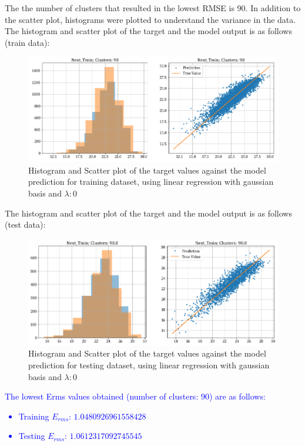 \documentclass[12pt,a4paper]{article}
\newcommand{\noi}{\noindent}
\begin{document}
\noi
The the number of clusters that resulted in the lowest RMSE is 90. In addition to the scatter plot, histograms were plotted to understand the variance in the data.\\

\noi
The histogram and scatter plot of the target and the model output is as follows (train data):
\begin{figure}[H]
     \centering
     \includegraphics[scale=0.49]{images/t3_d3/no_reg/T_min_nclu_90.png}
     \caption{Histogram and Scatter plot of the target values against the model prediction for training dataset, using linear regression with gaussian basis and $\lambda: 0$}
\end{figure}

\noi
The histogram and scatter plot of the target and the model output is as follows (test data):
\begin{figure}[H]
    \centering
    \includegraphics[scale=0.49]{images/t3_d3/no_reg/T_min_test.png}
    \caption{Histogram and Scatter plot of the target values against the model prediction for testing dataset, using linear regression with gaussian basis and $\lambda: 0$}
\end{figure}

\noi
\textcolor{blue}{
The lowest Erms values obtained (number of clusters: 90) are as follows:
\begin{itemize}
    \itemsep0em
    \item Training $E_{rms}$: $1.0480926961558428$
    \item Testing $E_{rms}$: $1.0612317092745545$
\end{itemize}
}
\end{document}
